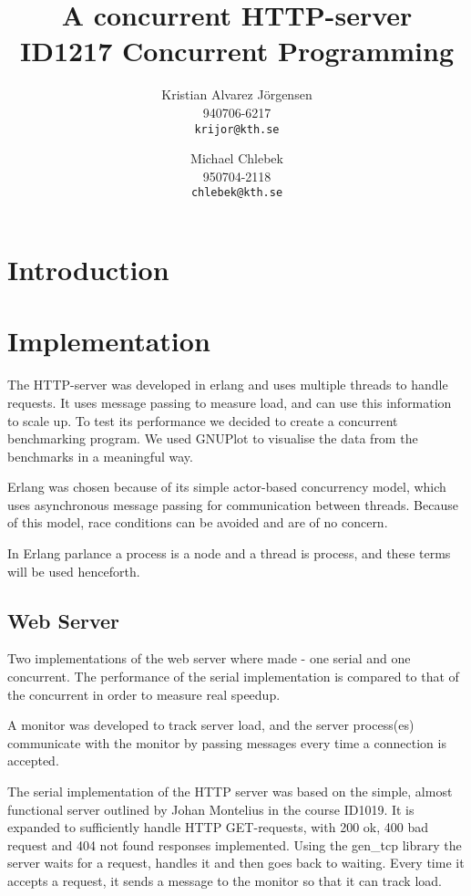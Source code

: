 \documentclass[12pt]{article}
\title{A concurrent HTTP-server
 \\ \large ID1217 Concurrent Programming }
\author{Kristian Alvarez Jörgensen\\940706-6217\\\texttt{krijor@kth.se}
 \and Michael Chlebek \\950704-2118\\\texttt{chlebek@kth.se}}
\begin{document}
 \maketitle

 \section{Introduction}

 \section{Implementation} 
 The HTTP-server was developed in erlang and uses multiple threads to handle requests. It uses message passing to measure load, and can use this information to scale up. To test its performance we decided to create a concurrent benchmarking program. We used GNUPlot to visualise the data from the benchmarks in a meaningful way.  

 Erlang was chosen because of its simple actor-based concurrency model, which uses asynchronous message passing for communication between threads. Because of this model, race conditions can be avoided and are of no concern. 

 In Erlang parlance a process is a node and a thread is process, and these terms will be used henceforth. 
 \subsection{Web Server}

 Two implementations of the web server where made - one serial and one concurrent. The performance of the serial implementation is compared to that of the concurrent in order to measure real speedup. 

 A monitor was developed to track server load, and the server process(es) communicate with the monitor by passing messages every time a connection is accepted. 

 The serial implementation of the HTTP server was based on the simple, almost functional server outlined by Johan Montelius in the course ID1019. It is expanded to sufficiently handle HTTP GET-requests, with 200 ok, 400 bad request and 404 not found responses implemented. Using the gen\_tcp library the server waits for a request, handles it and then goes back to waiting. Every time it accepts a request, it sends a message to the monitor so that it can track load. 
\end{document}
